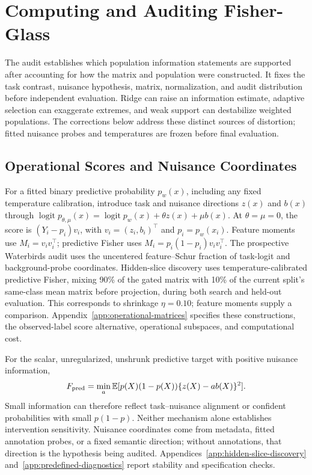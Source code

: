 \section{Computing and Auditing Fisher-Glass}
\label{sec:computing-auditing}

The audit establishes which population information statements are supported after accounting for how the matrix and population were constructed. It fixes the task contrast, nuisance hypothesis, matrix, normalization, and audit distribution before independent evaluation. Ridge can raise an information estimate, adaptive selection can exaggerate extremes, and weak support can destabilize weighted populations. The corrections below address these distinct sources of distortion; fitted nuisance probes and temperatures are frozen before final evaluation.

\subsection{Operational Scores and Nuisance Coordinates}
\label{sec:operational-scores}

For a fitted binary predictive probability $p_w(x)$, including any fixed temperature calibration, introduce task and nuisance directions $z(x)$ and $b(x)$ through $\operatorname{logit}p_{\theta,\mu}(x)=\operatorname{logit}p_w(x)+\theta z(x)+\mu b(x)$. At $\theta=\mu=0$, the score is $(Y_i-p_i)v_i$, with $v_i=(z_i,b_i)^\top$ and $p_i=p_w(x_i)$. Feature moments use $M_i=v_iv_i^\top$; predictive Fisher uses $M_i=p_i(1-p_i)v_iv_i^\top$. The prospective Waterbirds audit uses the uncentered feature--Schur fraction of task-logit and background-probe coordinates. Hidden-slice discovery uses temperature-calibrated predictive Fisher, mixing 90\% of the gated matrix with 10\% of the current split's same-class mean matrix before projection, during both search and held-out evaluation. This corresponds to shrinkage $\eta=0.10$; feature moments supply a comparison. Appendix~\ref{app:operational-matrices} specifies these constructions, the observed-label score alternative, operational subspaces, and computational cost.

For the scalar, unregularized, unshrunk predictive target with positive nuisance information,
\begin{equation}
F_{\mathrm{pred}}=\min_a\mathbb{E}[p(X)(1-p(X))\{z(X)-a b(X)\}^2].
\label{eq:predictive-confidence-decomposition}
\end{equation}
Small information can therefore reflect task--nuisance alignment or confident probabilities with small $p(1-p)$. Neither mechanism alone establishes intervention sensitivity. Nuisance coordinates come from metadata, fitted annotation probes, or a fixed semantic direction; without annotations, that direction is the hypothesis being audited. Appendices~\ref{app:hidden-slice-discovery} and~\ref{app:predefined-diagnostics} report stability and specification checks.

